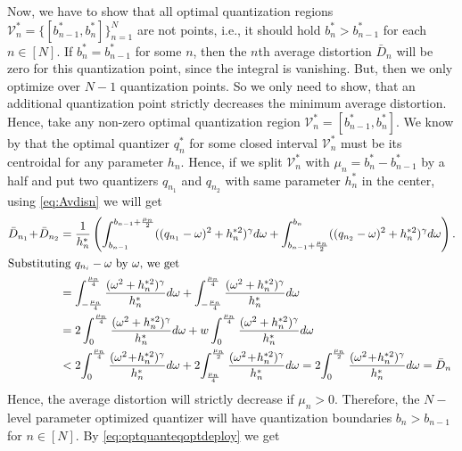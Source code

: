 \documentclass[12pt,onecolumn,final,letterpaper]{IEEEtran}
\newcommand{\Vor}{\ensuremath{\mathcal{V}}}         %
\newcommand{\Dis}{\ensuremath{D}}                    %
\newcommand{\AvDis}{\ensuremath{\bar{\Dis}}}         %
\begin{document}

  Now, we have to show that all optimal quantization regions $\Vor_n^*=\{[b^*_{n-1},b^*_n]\}_{n=1}^N$ are not points,
  i.e., it should hold $b^*_n>b^*_{n-1}$ for each $n\in[N]$. If $b^*_n=b^*_{n-1}$ for some $n$, then the $n$th average
  distortion $\AvDis_n$ will be zero for this quantization point, since the integral is vanishing. But, then we only
  optimize over $N-1$ quantization points. So we only need to show, that an additional quantization point strictly
  decreases the minimum average distortion.  Hence, take any non-zero optimal quantization region
  $\Vor_n^*=[b^*_{n-1},b^*_n]$. We know by  that the optimal quantizer $q_n^*$ for some closed interval
  $\Vor_n^*$  must be its centroidal for any parameter $h_n$.  Hence, if we split  $\Vor_n^*$ with
  $\mu_n=b^*_n-b^*_{n-1}$ by a half and put two quantizers $q_{n_1}$ and $q_{n_2}$ with same parameter $h_n^*$ in the
  center, using \eqref{eq:Avdisn} we will get
  \begin{align}
      \AvDis_{n_1}\!+\!\AvDis_{n_2}&=\frac{1}{h_n^*} 
     \left( \int_{b_{n-1}}^{b_{n-1}+\frac{\mu_n}{2}} ( (q_{n_1}-\ome)^2 + h_n^{*2})^{\gam}d\ome
     +\int_{b_{n-1}+\frac{\mu_n}{2}}^{b_n}((q_{n_2}-\ome)^2+h_n^{*2})^{\gam}d\ome\right).\notag\\
   \intertext{Substituting $q_{n_i}-\ome$ by $\ome$, we get} 
     & =  \int_{-\frac{\mu_n}{4}}^{\frac{\mu_n}{4}} \frac{(\ome^2+h_n^{*2})^{\gam}}{h_n^*}d\ome
     + \int_{-\frac{\mu_n}{4}}^{\frac{\mu_n}{4}} \frac{(\ome^2+h_n^{*2})^{\gam}}{h_n^*}d\ome\\
     & =  2\int_{0}^{\frac{\mu_n}{4}} \frac{(\ome^2+h_n^{*2})^{\gam}}{h_n^*}d\ome 
     + w\int_{0}^{\frac{\mu_n}{4}}    \frac{ (\ome^2+h_n^{*2})^{\gam}}{h_n^*}d\ome\\
     & <  2\!\int_{0}^{\frac{\mu_n}{4}} \frac{(\ome^2\!+\!h_n^{*2})^{\gam}}{h_n^*}d\ome
     + 2\!\int_{\frac{\mu_n}{4}}^{\frac{\mu_n}{2}} \frac{(\ome^2\!+\!h_n^{*2})^{\gam}}{h_n^*}d\ome
     = 2\!\int_0^{\frac{\mu_n}{2}} \frac{(\ome^2\!+\!h_n^{*2})^\gam}{h_n^*} d\ome=\AvDis_n\notag
  \end{align}
  Hence, the average distortion will strictly decrease if $\mu_n>0$. Therefore, the $N-$level parameter optimized
  quantizer will have quantization boundaries $b_n\!>\!b_{n\!-\!1}$ for $n\in[N]$.
   By \eqref{eq:optquanteqoptdeploy} we get 
\end{document}

